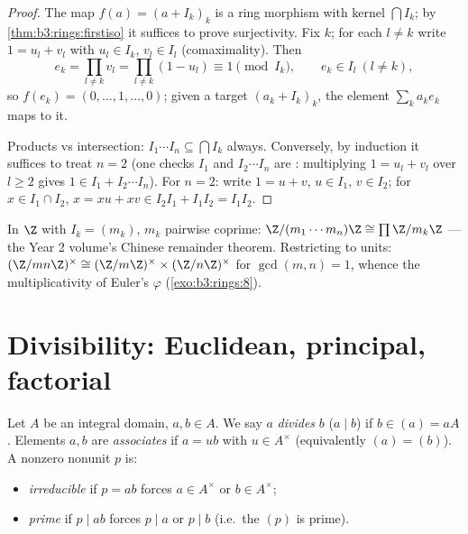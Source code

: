 \begin{proof}
The map $f(a) = (a + I_k)_k$ is a ring morphism with kernel
$\bigcap I_k$; by \cref{thm:b3:rings:firstiso} it suffices to
prove surjectivity. Fix $k$; for each $l \neq k$ write $1 = u_l +
v_l$ with $u_l \in I_k$, $v_l \in I_l$ (comaximality). Then
\[
e_k = \prod_{l \neq k} v_l = \prod_{l\neq k}(1 - u_l)
\equiv 1 \pmod{I_k},
\qquad e_k \in I_l \ (l \neq k),
\]
so $f(e_k) = (0, \dots, 1, \dots, 0)$; given a target $(a_k +
I_k)_k$, the element $\sum_k a_k e_k$ maps to it.

Products vs intersection: $I_1\cdots I_n \subseteq \bigcap I_k$
always. Conversely, by induction it suffices to treat $n = 2$
(one checks $I_1$ and $I_2\cdots I_n$ are : multiplying
$1 = u_l + v_l$ over $l \geq 2$ gives $1 \in I_1 + I_2\cdots
I_n$). For $n = 2$: write $1 = u + v$, $u \in I_1$, $v \in I_2$;
for $x \in I_1 \cap I_2$, $x = xu + xv \in I_2I_1 + I_1I_2 =
I_1I_2$.
\end{proof}

\begin{example}\label{ex:b3:rings:crtz}
In $\Z$ with $I_k = (m_k)$, $m_k$ pairwise coprime: $\Z/(m_1\cdots
m_n)\Z \cong \prod \Z/m_k\Z$ --- the Year 2 volume's Chinese
remainder theorem. Restricting to units: $(\Z/mn\Z)^\times \cong
(\Z/m\Z)^\times \times (\Z/n\Z)^\times$ for $\gcd(m,n)=1$, whence
the multiplicativity of Euler's $\varphi$
(\cref{exo:b3:rings:8}).
\end{example}

\section{Divisibility: Euclidean, principal, factorial}

\begin{definition}\label{def:b3:rings:divisibility}
Let $A$ be an integral domain, $a, b \in A$. We say $a$
\emph{divides} $b$ ($a \mid b$) if $b \in (a) = aA$. Elements $a,
b$ are \emph{associates} if $a = ub$
with $u \in A^\times$ (equivalently $(a) = (b)$). A nonzero
nonunit $p$ is:
\begin{itemize}
  \item \emph{irreducible} if $p = ab$
        forces $a \in A^\times$ or $b \in A^\times$;
  \item \emph{prime} if $p \mid ab$ forces $p
        \mid a$ or $p \mid b$ (i.e.\ the  $(p)$ is prime).
\end{itemize}
\end{definition}


